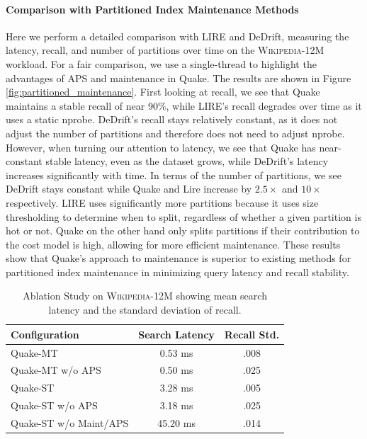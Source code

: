 \paragraph{Comparison with Partitioned Index Maintenance Methods} 
Here we perform a detailed comparison with LIRE and DeDrift, measuring the latency, recall, and number of partitions over time on the \textsc{Wikipedia-12M} workload. For a fair comparison, we use a single-thread to highlight the advantages of APS and maintenance in Quake. The results are shown in Figure \ref{fig:partitioned_maintenance}. First looking at recall, we see that Quake maintains a stable recall of near 90\%, while LIRE's recall degrades over time as it uses a static nprobe. DeDrift's recall stays relatively constant, as it does not adjust the number of partitions and therefore does not need to adjust nprobe. However, when turning our attention to latency, we see that Quake has near-constant stable latency, even as the dataset grows, while DeDrift's latency increases significantly with time. In terms of the number of partitions, we see DeDrift stays constant while Quake and Lire increase by $2.5\times$ and $10\times$ respectively. LIRE uses significantly more partitions because it uses size thresholding to determine when to split, regardless of whether a given partition is hot or not. Quake on the other hand only splits partitions if their contribution to the cost model is high, allowing for more efficient maintenance. These results show that Quake's approach to maintenance is superior to existing methods for partitioned index maintenance in minimizing query latency and recall stability.

\begin{table}[h]
\footnotesize
\centering
\caption{Ablation Study on \textsc{Wikipedia-12M} showing mean search latency and the standard deviation of recall.}
\label{tab:ablation_study}
\begin{tabular}{|l|c|c|}
\hline
\textbf{Configuration} & \textbf{Search Latency} & \textbf{Recall Std.} \\ \hline
Quake-MT            & 0.53 ms      &  .008              \\ \hline
Quake-MT w/o APS            & 0.50 ms     &  .025                \\ \hline
Quake-ST           & 3.28 ms    &  .005                 \\ \hline
Quake-ST w/o APS       & 3.18 ms      &  .025             \\ \hline
Quake-ST w/o Maint/APS & 45.20 ms   &  .014                   \\ \hline
\end{tabular}
\end{table}


